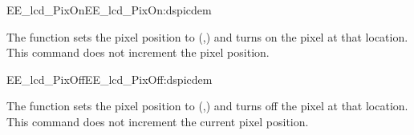 \begin{function_nopb2}{EE\_lcd\_PixOn}{EE_lcd_PixOn:dspicdem}
  
  \begin{fundescription}
    The function sets the pixel position to
    (,) and turns on the pixel at that
    location. This command does not increment the pixel position.
  \end{fundescription}
  
  \begin{funparameters}
  \end{funparameters}
  
  
\end{function_nopb2}

\begin{function_nopb2}{EE\_lcd\_PixOff}{EE_lcd_PixOff:dspicdem}
  
  \begin{fundescription}
    The function sets the pixel position to
    (,) and turns off the pixel at that
    location. This command does not increment the current pixel
    position.
  \end{fundescription}
  
  \begin{funparameters}
  \end{funparameters}
  
  
\end{function_nopb2}


